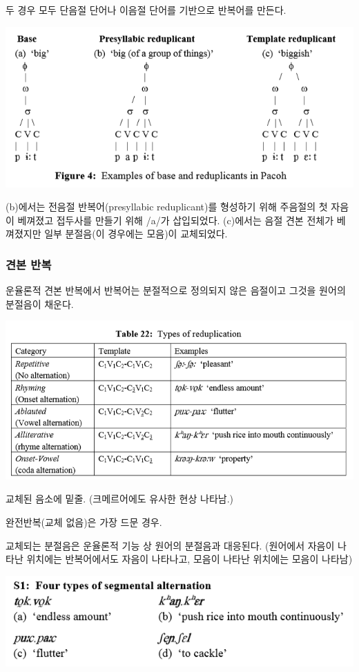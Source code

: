두 경우 모두 단음절 단어나 이음절 단어를 기반으로 반복어를 만든다.

\begin{center}
\includegraphics{Pacoh/src/PacohFigure4.png}
\end{center}

(b)에서는 전음절 반복어(presyllabic reduplicant)를 형성하기 위해 주음절의 첫 자음이 베껴졌고 접두사를 만들기 위해 /a/가 삽입되었다. (c)에서는 음절 견본 전체가 베껴졌지만 일부 분절음(이 경우에는 모음)이 교체되었다.

\subsubsection{견본 반복}
운율론적 견본 반복에서 반복어는 분절적으로 정의되지 않은 음절이고 그것을 원어의 분절음이 채운다.

\includegraphics{Pacoh/src/PacohTable22.png}

교체된 음소에 밑줄. (크메르어에도 유사한 현상 나타남.)

완전반복(교체 없음)은 가장 드문 경우. 

교체되는 분절음은 운율론적 기능 상 원어의 분절음과 대응된다. (원어에서 자음이 나타난 위치에는 반복어에서도 자음이 나타나고, 모음이 나타난 위치에는 모음이 나타남)

\includegraphics{Pacoh/src/PacohS1.png}

